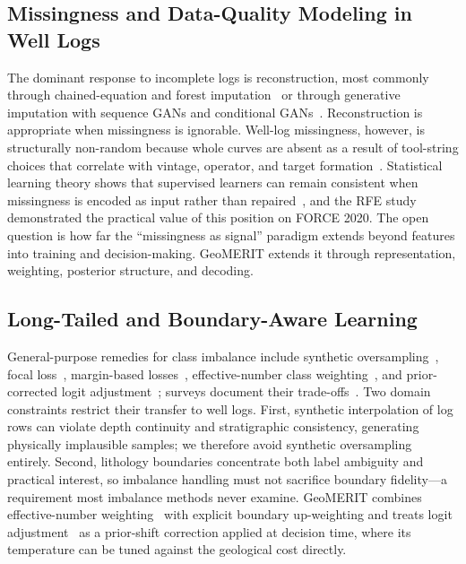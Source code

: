 \documentclass[bdcc,article,submit,pdftex,moreauthors]{Definitions/mdpi}
\begin{document}
\subsection{Missingness and Data-Quality Modeling in Well Logs}
The dominant response to incomplete logs is reconstruction, most commonly through chained-equation
and forest imputation~\cite{vanbuuren2011mice,stekhoven2012missforest} or through generative
imputation with sequence GANs and conditional GANs~\cite{liu2025wellgan,xie2024cgan}. Reconstruction is
appropriate when missingness is ignorable. Well-log missingness, however, is structurally
non-random because whole curves are absent as a result of tool-string choices that correlate
with vintage, operator, and target formation~\cite{chen2026rfe}. Statistical learning theory shows
that supervised learners can remain consistent when missingness is encoded as input rather
than repaired~\cite{little2019stats,josse2024missing}, and the RFE
study~\cite{chen2026rfe} demonstrated the practical value of this position on FORCE 2020.
The open question is how far the ``missingness as signal'' paradigm extends beyond features
into training and decision-making. GeoMERIT extends it through representation, weighting,
posterior structure, and decoding.

\subsection{Long-Tailed and Boundary-Aware Learning}
General-purpose remedies for class imbalance include synthetic
oversampling~\cite{chawla2002smote}, focal loss~\cite{lin2017focal}, margin-based
losses~\cite{cao2019ldam}, effective-number class weighting~\cite{cui2019classbalanced}, and
prior-corrected logit adjustment~\cite{menon2021logit}; surveys document their
trade-offs~\cite{he2024imbalanced}. Two domain constraints restrict their transfer to well
logs. First, synthetic interpolation of log rows can violate depth continuity and
stratigraphic consistency, generating physically implausible samples; we therefore avoid
synthetic oversampling entirely. Second, lithology boundaries concentrate both label
ambiguity and practical interest, so imbalance handling must not sacrifice boundary
fidelity---a requirement most imbalance methods never examine. GeoMERIT combines
effective-number weighting~\cite{cui2019classbalanced} with explicit boundary up-weighting and
treats logit adjustment~\cite{menon2021logit} as a prior-shift correction applied at decision
time, where its temperature can be tuned against the geological cost directly.
\end{document}
